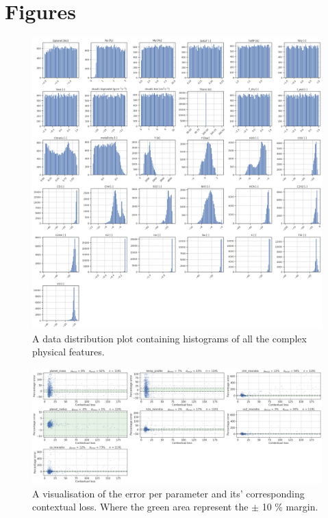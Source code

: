 \newpage

\chapter{Figures} \label{appendix_figures}

\begin{figure} [!htb]
    \centering
    \includegraphics[scale=0.3]{figuren/complex features hist original.png}
    \caption{A data distribution plot containing histograms of all the complex physical features.}
    \label{fig:distribution_original}
\end{figure}

\begin{figure} [!htb]
    \centering
    \includegraphics[width=\textwidth,height=\textheight,keepaspectratio]{figuren/contextual errors.png}
    \caption{A visualisation of the error per parameter and its' corresponding contextual loss. Where the green area represent the $\pm$ 10 \% margin.}
    \label{fig:contextual_errors}
\end{figure}

